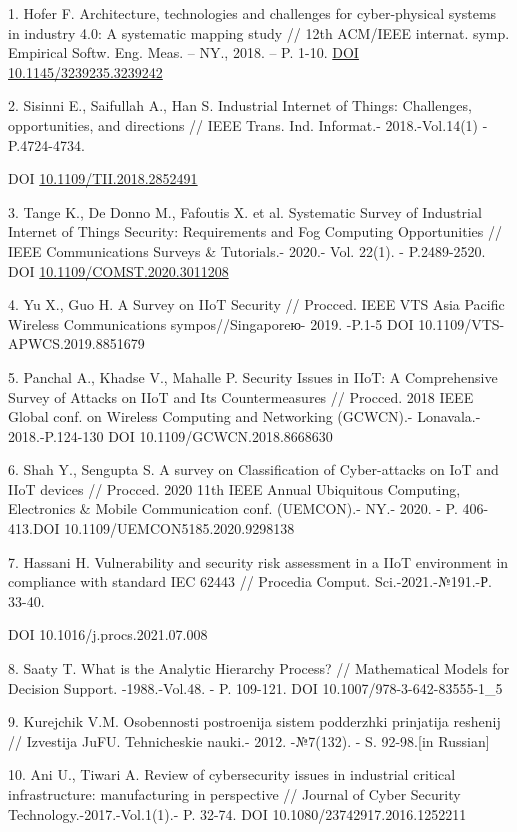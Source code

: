 \begin{references}
1. Hofer F. Architecture, technologies and challenges for cyber-physical
systems in industry 4.0: A systematic mapping study // 12th ACM/IEEE
internat. symp. Empirical Softw. Eng. Meas. -- NY., 2018. -- P. 1-10.
\href{https://doi.org/10.1145/3239235.3239242}{DOI
10.1145/3239235.3239242}

2. Sisinni E., Saifullah A., Han S. Industrial Internet of Things:
Challenges, opportunities, and directions // IEEE Trans. Ind. Informat.-
2018.-Vol.14(1) - P.4724-4734.

DOI
\href{https://doi.org/10.1109/TII.2018.2852491}{10.1109/TII.2018.2852491}

3. Tange K., De Donno M., Fafoutis X. et al. Systematic Survey of
Industrial Internet of Things Security: Requirements and Fog Computing
Opportunities // IEEE Communications Surveys \& Tutorials.- 2020.- Vol.
22(1). - P.2489-2520. DOI
\href{http://dx.doi.org/10.1109/COMST.2020.3011208}{10.1109/COMST.2020.3011208}

4. Yu X., Guo H. A Survey on IIoT Security // Procced. IEEE VTS Asia
Pacific Wireless Communications sympos//Singaporeю- 2019. -P.1-5 DOI
10.1109/VTS-APWCS.2019.8851679

5. Panchal A., Khadse V., Mahalle P. Security Issues in IIoT: A
Comprehensive Survey of Attacks on IIoT and Its Countermeasures //
Procced. 2018 IEEE Global conf. on Wireless Computing and Networking
(GCWCN).- Lonavala.- 2018.-P.124-130 DOI 10.1109/GCWCN.2018.8668630

6. Shah Y., Sengupta S. A survey on Classification of Cyber-attacks on
IoT and IIoT devices // Procced. 2020 11th IEEE Annual Ubiquitous
Computing, Electronics \& Mobile Communication conf. (UEMCON).- NY.-
2020. - P. 406-413.DOI 10.1109/UEMCON5185.2020.9298138

7. Hassani H. Vulnerability and security risk assessment in a IIoT
environment in compliance with standard IEC 62443 // Procedia Comput.
Sci.-2021.-№191.-Р. 33-40.

DOI 10.1016/j.procs.2021.07.008

8. Saaty T. What is the Analytic Hierarchy Process? // Mathematical
Models for Decision Support. -1988.-Vol.48. - P. 109-121. DOI
10.1007/978-3-642-83555-1\_5

9. Kurejchik V.M. Osobennosti postroenija sistem podderzhki prinjatija
reshenij // Izvestija JuFU. Tehnicheskie nauki.- 2012. -№7(132). - S.
92-98.{[}in Russian{]}

10. Ani U., Tiwari A. Review of cybersecurity issues in industrial
critical infrastructure: manufacturing in perspective // Journal of
Cyber Security Technology.-2017.-Vol.1(1).- P. 32-74. DOI
10.1080/23742917.2016.1252211


\end{references}
